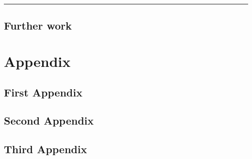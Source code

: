 \documentclass[a4paper,12pt,twoside,notitlepage]{report}
\newcommand{\rulewidth}{300pt}
\newcommand{\halfrule}{
  \begin{center}
    {\rule{\rulewidth}{0.5pt}}
  \end{center}}
\begin{document}
\halfrule

\section{Further work}


\begin{thebibliography}{}
\end{thebibliography}


\appendix
\chapter*{Appendix}

\pagestyle{fancy}

\setcounter{chapter}{1}
\setcounter{section}{0}
\renewcommand{\thechapter}{\Alph{chapter}}

\section{First Appendix}
\section{Second Appendix}
\section{Third Appendix}
\end{document}
